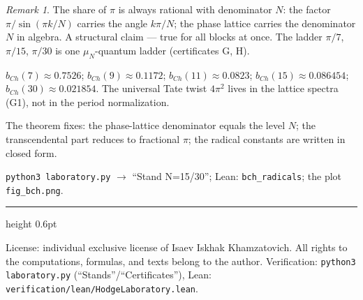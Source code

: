 \documentclass[11pt,a4paper]{article}
\theoremstyle{plain}
\theoremstyle{definition}
\theoremstyle{remark}
\newtheorem{remark}[theorem]{Remark}
\begin{document}
\begin{remark}
The share of $\pi$ is always rational with denominator $N$: the
factor $\pi/\sin(\pi k/N)$ carries the angle $k\pi/N$; the phase
lattice carries the denominator $N$ in algebra. A structural claim
--- true for all blocks at once. The ladder $\pi/7$, $\pi/15$,
$\pi/30$ is one $\mu_N$-quantum ladder (certificates G, H).
\end{remark}

\begin{databox}[numbers]
$b_{Ch}(7)\approx0.7526$; $b_{Ch}(9)\approx0.1172$;
$b_{Ch}(11)\approx0.0823$; $b_{Ch}(15)\approx0.086454$;
$b_{Ch}(30)\approx0.021854$. The universal Tate twist $4\pi^2$ lives
in the lattice spectra (G1), not in the period normalization.
\end{databox}

\begin{statusbox}[summary]
The theorem fixes: the phase-lattice denominator equals the level
$N$; the transcendental part reduces to fractional $\pi$; the
radical constants are written in closed form.
\end{statusbox}

\begin{verifybox}[reproduction]
\texttt{python3 laboratory.py} $\to$ ``Stand N=15/30''; Lean:
\texttt{bch\_radicals}; the plot \texttt{fig\_bch.png}.
\end{verifybox}

\vfill
{\color{linkblue}\hrule height 0.6pt}
\vspace{0.5em}
{\small\color{gray}
License: individual exclusive license of Isaev Iskhak Khamzatovich.
All rights to the computations, formulas, and texts belong to the author.
Verification: \texttt{python3 laboratory.py} (``Stands''/``Certificates''),
Lean: \texttt{verification/lean/HodgeLaboratory.lean}.
}
\end{document}
